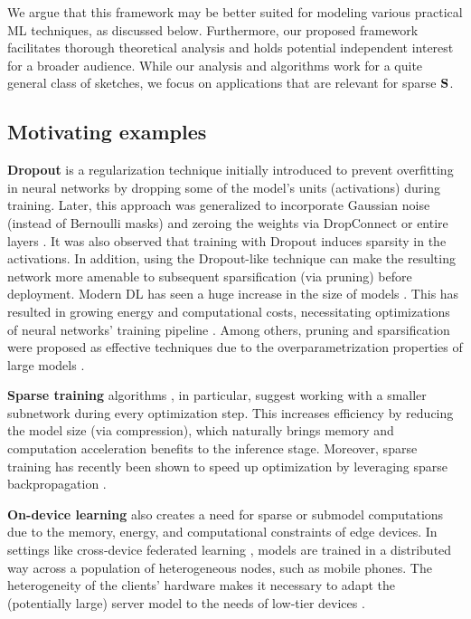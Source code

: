 \documentclass{article}
\theoremstyle{plain}
\newcommand{\mS}{{\bf S}}
\theoremstyle{plain}
\theoremstyle{definition}
\theoremstyle{remark}
\begin{document}
We argue that this framework may be better suited for modeling various practical ML techniques, as discussed below. Furthermore, our proposed framework facilitates thorough theoretical analysis and holds potential independent interest for a broader audience.
While our analysis and algorithms work for a quite general class of sketches, we focus on applications that are relevant for sparse $\mS$.

\subsection{Motivating examples}

\textbf{Dropout} \citep{hanson1990stochastic, hinton2012improving, frazier2018dropout} is a regularization technique initially introduced to prevent overfitting in neural networks by dropping some of the model's units (activations) during training. Later, this approach was generalized to incorporate Gaussian noise \citep{wang2013fast, srivastava2014dropout} (instead of Bernoulli masks) and zeroing the weights via DropConnect \citep{wan2013regularization} or entire layers \citep{fan2019reducing}. It was also observed \citep{srivastava2014dropout} that training with Dropout induces sparsity in the activations. In addition, using the Dropout-like technique \citep{gomez2019learning, lejeune2021flip} can make the resulting network more amenable to subsequent sparsification (via pruning) before deployment. Modern DL has seen a huge increase in the size of models \citep{villalobos2022machine}. This has resulted in growing energy and computational costs, necessitating optimizations of neural networks' training pipeline \citep{yang2017method}. Among others, pruning and sparsification were proposed as effective techniques due to the overparametrization properties of large models \citep{chang2021provable}.

\textbf{Sparse training} algorithms \citep{mocanu2016topological, guo2016dynamic, mocanu2018scalable}, in particular, suggest working with a smaller subnetwork during every optimization step. This increases efficiency by reducing the model size (via compression), which naturally brings memory and computation acceleration benefits to the inference stage. Moreover, sparse training has recently been shown to speed up optimization by leveraging sparse backpropagation \citep{nikdan2023sparseprop}.

\textbf{On-device learning} also creates a need for sparse or submodel computations due to the memory, energy, and computational constraints of edge devices. In settings like cross-device federated learning \citep{konecny2017federated, mcmahan2017communication, kairouz2021advances}, models are trained in a distributed way across a population of heterogeneous nodes, such as mobile phones.
The heterogeneity of the clients' hardware makes it necessary to adapt the (potentially large) server model to the needs of low-tier devices \citep{caldas2018expanding, bouacida2021adaptive, horvath2021fjord}.
\end{document}
